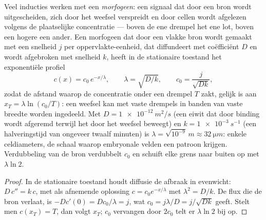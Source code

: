 \begin{theorem}\label{thm:b2:vertebrate-development:gradient}
Veel inducties werken met een \emph{morfogeen}: een signaal dat door een
bron wordt uitgescheiden, zich door het weefsel verspreidt en door cellen
wordt afgelezen volgens de plaatselijke concentratie --- boven de ene
drempel het ene lot, boven een hogere een ander. Een morfogeen dat door een
vlakke bron wordt gemaakt met een snelheid
$j$ per oppervlakte-eenheid, dat diffundeert met coëfficiënt $D$ en wordt
afgebroken met snelheid $k$, heeft in de stationaire toestand het
exponentiële profiel
\[
c(x) = c_0\,e^{-x/\lambda}, \qquad \lambda = \sqrt{D/k}, \qquad c_0 = \frac{j}{\sqrt{Dk}},
\]
zodat de afstand waarop de concentratie onder een drempel $T$ zakt, gelijk
is aan $x_T = \lambda\ln(c_0/T)$: een weefsel kan met vaste drempels in
banden van vaste breedte worden ingedeeld. Met $D =
\qty{1e-12}{m^2/s}$ (een eiwit dat door binding wordt afgeremd terwijl het
door het weefsel beweegt) en $k = \qty{1e-3}{s^{-1}}$ (een halveringstijd
van ongeveer twaalf minuten) is $\lambda = \sqrt{10^{-9}}\,\unit{m} \approx
\qty{32}{\micro m}$: enkele celdiameters,
de schaal waarop embryonale velden een patroon krijgen. Verdubbeling van de
bron verdubbelt $c_0$ en schuift elke grens naar buiten op met $\lambda
\ln 2$.
\end{theorem}
\begin{proof}
In de stationaire toestand houdt diffusie de afbraak in evenwicht: $D\,c'' = k\,c$,
met als afnemende oplossing $c = c_0 e^{-x/\lambda}$ met $\lambda^2 =
D/k$. De flux die de bron verlaat, is $-Dc'(0) = Dc_0/\lambda = j$,
wat $c_0 = j\lambda/D = j/\sqrt{Dk}$ geeft. Stelt men $c(x_T) = T$,
dan volgt $x_T$; $c_0$ vervangen door $2c_0$ telt er $\lambda\ln 2$ bij op.
\end{proof}

